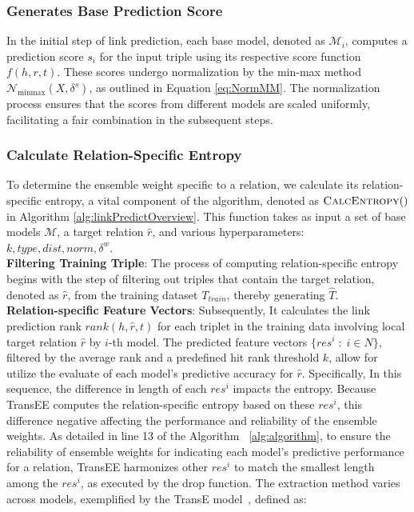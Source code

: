 \documentclass{article}
\begin{document}
\subsubsection{Generates Base Prediction Score}
In the initial step of link prediction, each base model, denoted as $\mathcal{M}_i$, computes a prediction score $s\acute{}_i$ for the input triple using its respective score function $f(h,r,t)$. These scores undergo normalization by the min-max method $\mathcal{N}_{\text{minmax}}(X, \delta^s)$, as outlined in Equation \ref{eq:NormMM}. The normalization process ensures that the scores from different models are scaled uniformly, facilitating a fair combination in the subsequent steps.

\subsubsection{Calculate Relation-Specific Entropy}
To determine the ensemble weight specific to a relation, we calculate its relation-specific entropy, a vital component of the algorithm, denoted as $\Call{CalcEntropy}$ in Algorithm \ref{alg:linkPredictOverview}. This function takes as input a set of base models $\mathcal{M}$, a target relation $\hat{r}$, and various hyperparameters: $k, type, dist, norm, \delta^w$. \\
\textbf{Filtering Training Triple}: The process of computing relation-specific entropy begins with the step of filtering out triples that contain the target relation, denoted as $\hat{r}$, from the training dataset $T_{train}$, thereby generating $\hat{T}$. \\
\textbf{Relation-specific Feature Vectors}: Subsequently, It calculates the link prediction rank $rank(h, \hat{r}, t)$ for each triplet in the training data involving local target relation $\hat{r}$ by $i$-th model. The predicted feature vectors $\{res^i \;:\; i \in N\}$, filtered by the average rank and a predefined hit rank threshold $k$, allow for utilize the evaluate of each model’s predictive accuracy for $\hat{r}$. Specifically, In this sequence, the difference in length of each $res^i$ impacts the entropy. Because TransEE computes the relation-specific entropy based on these $res^i$, this difference negative affecting the performance and reliability of the ensemble weights. As detailed in line 13 of the Algorithm ~\ref{alg:algorithm}, to ensure the reliability of ensemble weights for indicating each model's predictive performance for a relation, TransEE harmonizes other $res^i$ to match the smallest length among the $res^i$, as executed by the $\mathrm{drop}$ function. The extraction method varies across models, exemplified by the TransE model~\cite{bordes2013translating}, defined as:
\end{document}
